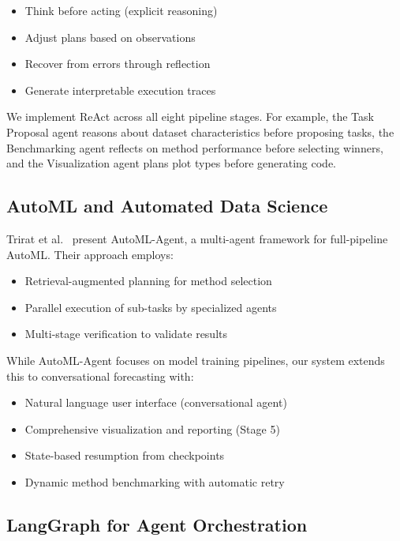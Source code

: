\documentclass[11pt,a4paper]{article}
\begin{document}
\begin{itemize}
    \item Think before acting (explicit reasoning)
    \item Adjust plans based on observations
    \item Recover from errors through reflection
    \item Generate interpretable execution traces
\end{itemize}

We implement ReAct across all eight pipeline stages. For example, the Task Proposal agent reasons about dataset characteristics before proposing tasks, the Benchmarking agent reflects on method performance before selecting winners, and the Visualization agent plans plot types before generating code.

\subsection{AutoML and Automated Data Science}

Trirat et al.~\cite{automl_agent} present AutoML-Agent, a multi-agent framework for full-pipeline AutoML. Their approach employs:

\begin{itemize}
    \item Retrieval-augmented planning for method selection
    \item Parallel execution of sub-tasks by specialized agents
    \item Multi-stage verification to validate results
\end{itemize}

While AutoML-Agent focuses on model training pipelines, our system extends this to conversational forecasting with:

\begin{itemize}
    \item Natural language user interface (conversational agent)
    \item Comprehensive visualization and reporting (Stage 5)
    \item State-based resumption from checkpoints
    \item Dynamic method benchmarking with automatic retry
\end{itemize}

\subsection{LangGraph for Agent Orchestration}
\end{document}
